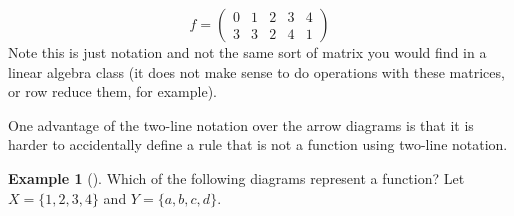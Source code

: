 \documentclass[10pt,]{book}
\theoremstyle{plain}
\theoremstyle{definition}
\theoremstyle{definition}
\newtheorem{example}[theorem]{Example}
\theoremstyle{definition}
\numberwithin{equation}{chapter}
\newlength{\panelmax}
\newcommand{\twoline}[2]{\begin{pmatrix}#1 \\ #2 \end{pmatrix}}
\newcommand{\amp}{&}
\begin{document}
\begin{equation*}
f = \twoline{0 \amp 1 \amp 2\amp 3 \amp 4}{3 \amp 3 \amp 2 \amp 4 \amp 1}
\end{equation*}
Note this is just notation and not the same sort of matrix you would find in a linear algebra class (it does not make sense to do operations with these matrices, or row reduce them, for example).%
\par
\hypertarget{p-2099}{}%
One advantage of the two-line notation over the arrow diagrams is that it is harder to accidentally define a rule that is not a function using two-line notation.%
\begin{example}[]\label{example-27}
\hypertarget{p-2100}{}%
Which of the following diagrams represent a function? Let \(X = \{1,2,3,4\}\) and \(Y = \{a,b,c,d\}\).%
{%
\setlength{\panelmax}{0pt}
\ifdefined\panelboxAimage\else\newsavebox{\panelboxAimage}\fi%
\begin{lrbox}{\panelboxAimage}
\end{lrbox}
\ifdefined\phAimage\else\newlength{\phAimage}\fi%
\setlength{\phAimage}{\ht\panelboxAimage+\dp\panelboxAimage}
\settototalheight{\phAimage}{\usebox{\panelboxAimage}}
\setlength{\panelmax}{\maxof{\panelmax}{\phAimage}}
\ifdefined\panelboxBimage\else\newsavebox{\panelboxBimage}\fi%
\begin{lrbox}{\panelboxBimage}
\end{lrbox}
\ifdefined\phBimage\else\newlength{\phBimage}\fi%
}
\end{example}
\end{document}
